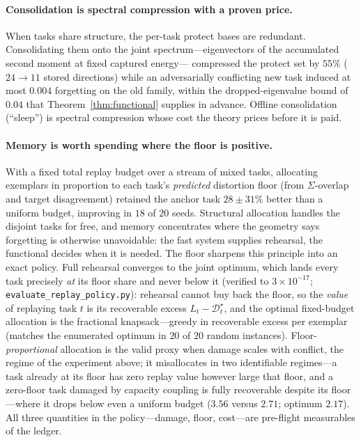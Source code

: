 \documentclass[10pt,a4paper]{article}
\theoremstyle{plain}
\theoremstyle{definition}
\newcommand{\Sig}{\Sigma}
\begin{document}
\paragraph{Consolidation is spectral compression with a proven price.} When tasks share
structure, the per-task protect bases are redundant. Consolidating them onto the joint
spectrum---eigenvectors of the accumulated second moment at fixed captured energy---
compressed the protect set by $55\%$ ($24\to11$ stored directions) while an adversarially
conflicting new task induced at most $0.004$ forgetting on the old family, within the
dropped-eigenvalue bound of $0.04$ that Theorem~\ref{thm:functional} supplies in advance.
Offline consolidation (``sleep'') is spectral compression whose cost the theory prices
before it is paid.

\paragraph{Memory is worth spending where the floor is positive.} With a fixed total replay
budget over a stream of mixed tasks, allocating exemplars in proportion to each task's
\emph{predicted} distortion floor (from $\Sig$-overlap and target disagreement) retained the
anchor task $28\pm31\%$ better than a uniform budget, improving in $18$ of $20$ seeds.
Structural allocation handles the disjoint tasks for free, and memory concentrates where the
geometry says forgetting is otherwise unavoidable: the fast system supplies rehearsal, the
functional decides when it is needed. The floor sharpens this principle into an exact
policy. Full rehearsal converges to the joint optimum, which lands every task precisely
\emph{at} its floor share and never below it (verified to $3\times10^{-17}$;
\texttt{evaluate\_replay\_policy.py}): rehearsal cannot buy back the floor, so the
\emph{value} of replaying task $t$ is its recoverable excess $L_t-\mathcal{D}^\star_t$,
and the optimal fixed-budget allocation is the fractional knapsack---greedy in
recoverable excess per exemplar (matches the enumerated optimum in $20$ of $20$ random
instances). Floor-\emph{proportional} allocation is the valid proxy when damage scales
with conflict, the regime of the experiment above; it misallocates in two identifiable
regimes---a task already at its floor has zero replay value however large that floor,
and a zero-floor task damaged by capacity coupling is fully recoverable despite its
floor---where it drops below even a uniform budget ($3.56$ versus $2.71$; optimum
$2.17$). All three quantities in the policy---damage, floor, cost---are pre-flight
measurables of the ledger.
\end{document}
